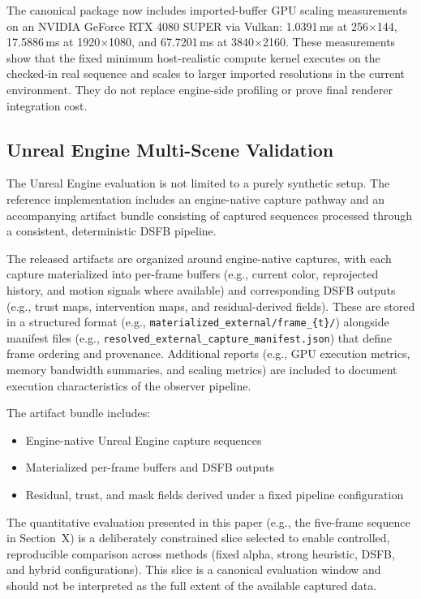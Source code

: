 \documentclass[11pt,letterpaper]{article}
\theoremstyle{gcresult}
\theoremstyle{definition}
\begin{document}
The canonical package now includes imported-buffer GPU scaling measurements on an NVIDIA GeForce RTX 4080 SUPER via Vulkan: 1.0391\,ms at 256$\times$144, 17.5886\,ms at 1920$\times$1080, and 67.7201\,ms at 3840$\times$2160. These measurements show that the fixed minimum host-realistic compute kernel executes on the checked-in real sequence and scales to larger imported resolutions in the current environment. They do not replace engine-side profiling or prove final renderer integration cost.

\subsection{Unreal Engine Multi-Scene Validation}

The Unreal Engine evaluation is not limited to a purely synthetic setup. The reference implementation includes an engine-native capture pathway and an accompanying artifact bundle consisting of captured sequences processed through a consistent, deterministic DSFB pipeline.

The released artifacts are organized around engine-native captures, with each capture materialized into per-frame buffers (e.g., current color, reprojected history, and motion signals where available) and corresponding DSFB outputs (e.g., trust maps, intervention maps, and residual-derived fields). These are stored in a structured format (e.g., \texttt{materialized\_external/frame\_\{t\}/}) alongside manifest files (e.g., \texttt{resolved\_external\_capture\_manifest.json}) that define frame ordering and provenance. Additional reports (e.g., GPU execution metrics, memory bandwidth summaries, and scaling metrics) are included to document execution characteristics of the observer pipeline.

The artifact bundle includes:
\begin{itemize}
    \item Engine-native Unreal Engine capture sequences
    \item Materialized per-frame buffers and DSFB outputs
    \item Residual, trust, and mask fields derived under a fixed pipeline configuration
\end{itemize}

The quantitative evaluation presented in this paper (e.g., the five-frame sequence in Section~X) is a deliberately constrained slice selected to enable controlled, reproducible comparison across methods (fixed alpha, strong heuristic, DSFB, and hybrid configurations). This slice is a canonical evaluation window and should not be interpreted as the full extent of the available captured data.
\end{document}
